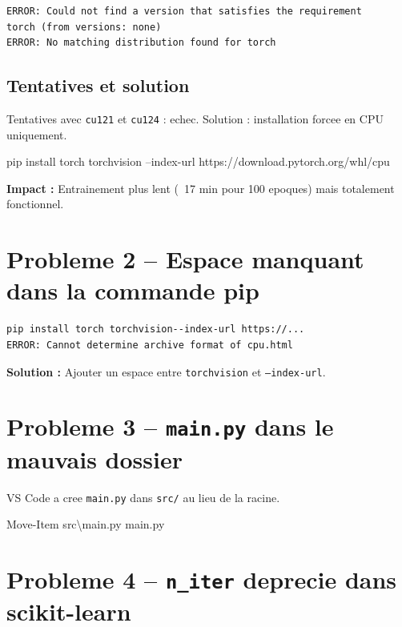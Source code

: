 \documentclass[12pt,a4paper]{report}
\begin{document}
\begin{lstlisting}[style=bash,caption={Erreur installation GPU}]
ERROR: Could not find a version that satisfies the requirement
torch (from versions: none)
ERROR: No matching distribution found for torch
\end{lstlisting}

\subsection{Tentatives et solution}

Tentatives avec \texttt{cu121} et \texttt{cu124} : echec.
Solution : installation forcee en CPU uniquement.

\begin{cmdbox}
pip install torch torchvision --index-url https://download.pytorch.org/whl/cpu
\end{cmdbox}

\textbf{Impact :} Entrainement plus lent (~17 min pour 100 epoques)
mais totalement fonctionnel.

\section{Probleme 2 -- Espace manquant dans la commande pip}

\begin{lstlisting}[style=bash,caption={Erreur syntaxe pip}]
pip install torch torchvision--index-url https://...
ERROR: Cannot determine archive format of cpu.html
\end{lstlisting}

\textbf{Solution :} Ajouter un espace entre
\texttt{torchvision} et \texttt{--index-url}.

\section{Probleme 3 -- \texttt{main.py} dans le mauvais dossier}

VS Code a cree \texttt{main.py} dans \texttt{src/} au lieu de
la racine.

\begin{cmdbox}[-- Correction]
Move-Item src\textbackslash main.py main.py
\end{cmdbox}

\section{Probleme 4 -- \texttt{n\_iter} deprecie dans scikit-learn}
\end{document}
